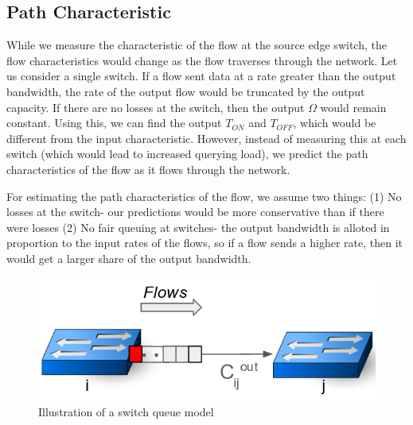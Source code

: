 \subsection{Path Characteristic}
While we measure the characteristic of the flow at the source edge switch, 
the flow characteristics would change as the flow traverses through the network.
Let us consider a single switch. If a flow sent data at a rate greater than the output
bandwidth, the rate of the output flow would be truncated by the output capacity. 
If there are no losses at the switch, then the output $\Omega$ would remain
constant. Using this, we can find the output $T_{ON}$ and $T_{OFF}$, which
would be different from the input characteristic. However, instead of measuring 
this at each switch (which would lead to increased querying load), we predict
the path characteristics of the flow as it flows through the network. 

For estimating the path characteristics of the flow, we assume two things: (1) No losses
at the switch- our predictions would be more conservative than if there were losses
(2) No fair queuing at switches- the output bandwidth is alloted in proportion to the input
rates of the flows, so if a flow sends a higher rate, then it would get a larger share of the output 
bandwidth. 

\begin{figure}[H]
	\centering
	\includegraphics[width=\columnwidth]{switchmodel.png}
	\caption{Illustration of a switch queue model}
	\label{fig:switchmodel}
\end{figure}


